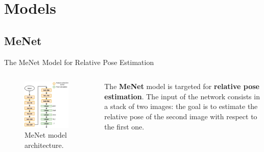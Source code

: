 \documentclass[
    center,
]{beamer}
\begin{document}
\section{Models}
\subsection{MeNet}
\begin{frame}{The MeNet Model for Relative Pose Estimation}
    \begin{columns}
        \begin{figure}
            \centering
            \includegraphics[width=0.9\textwidth]{../imgs/menet_structure.png}
            \caption{MeNet model architecture.}
        \end{figure}

        The \textbf{MeNet} model is targeted for \textbf{relative pose estimation}.
        The input of the network consists in a stack of two images: the goal is to estimate the relative pose of the second image with respect to the first one.
    \end{columns}
\end{frame}
\end{document}
